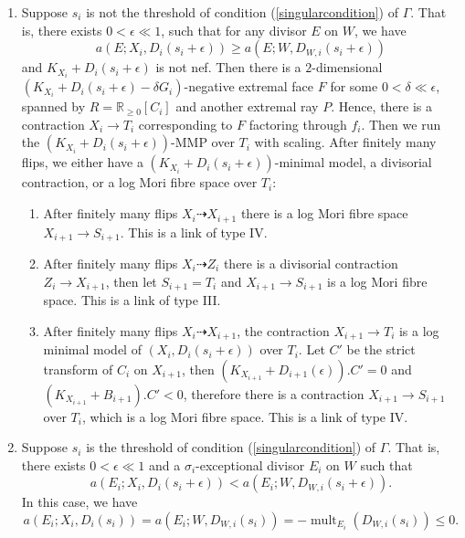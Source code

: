 \documentclass[11pt]{amsart}
\numberwithin{equation}{section}
\theoremstyle{definition}
\theoremstyle{definition}
\theoremstyle{definition}
\begin{document}
\begin{enumerate}
  \item\label{a} Suppose $s_{i}$ is not the threshold of  condition (\ref{singularcondition}) of $\Gamma$. That is, there exists $0<\epsilon\ll 1$, such that for any divisor $E$ on $W$, we have
  \[
    a(E;X_{i},D_{i}(s_{i}+\epsilon))\geqslant a(E;W,D_{W,i}(s_{i}+\epsilon))
  \]
  and $K_{X_{i}}+D_{i}(s_{i}+\epsilon)$ is not nef. Then there is a $2$-dimensional $(K_{X_{i}}+D_{i}(s_{i}+\epsilon)-\delta G_{i})$-negative extremal face $F$ for some $0< \delta \ll \epsilon $, spanned by $R=\mathbb{R}_{\geqslant 0}[C_{i}]$ and another extremal ray $P$. Hence, there is a contraction $X_{i}\to T_{i}$ corresponding to $F$ factoring through $f_{i}$. Then we run the $(K_{X_{i}}+D_{i}(s_{i}+\epsilon))$-MMP over $T_{i}$ with scaling. After finitely many flips, we either have a $(K_{X_{i}}+D_{i}(s_{i}+\epsilon))$-minimal model, a divisorial contraction, or a log Mori fibre space over $T_{i}$:
  \begin{enumerate}
    \item\label{a1}After finitely many flips $X_{i}\dashrightarrow X_{i+1}$ there is a log Mori fibre space $X_{i+1}\to S_{i+1}$. This is a link of type IV.
    \item\label{a2} After finitely many flips $X_{i}\dashrightarrow Z_{i}$ there is a divisorial contraction $Z_{i}\to X_{i+1}$, then let $S_{i+1}=T_{i}$ and $X_{i+1}\to S_{i+1}$ is a log Mori fibre space. This is a link of type III.
    \item \label{a3}After finitely many flips $X_{i}\dashrightarrow X_{i+1}$,  the contraction $X_{i+1}\to T_{i}$ is a log minimal model of $\left(X_{i},D_{i}\left(s_{i}+\epsilon\right)\right)$ over $T_{i}$. Let  $C'$ be the strict transform of  $C_{i}$ on $X_{i+1}$, then $(K_{X_{i+1}}+D_{i+1}(\epsilon)).C'=0$ and $(K_{X_{i+1}}+B_{i+1}).C'<0$, therefore there is a contraction  $X_{i+1} \to S_{i+1}$ over $T_i$, which is a log Mori fibre space. This is a link of type IV.
  \end{enumerate}
  \item\label{b} Suppose $s_{i}$ is the threshold of condition (\ref{singularcondition}) of $\Gamma$. That is, there exists  $0<\epsilon \ll 1$ and a $\sigma_{i}$-exceptional divisor $E_{i}$ on $W$ such that
  \[
    a(E_{i};X_{i},D_{i}(s_{i}+\epsilon))< a(E_{i};W,D_{W,i}(s_{i}+\epsilon))
    .\]
  In this case, we have
  \[
    a(E_{i};X_{i},D_{i}(s_{i}))= a(E_{i};W,D_{W,i}(s_{i}))=-\operatorname{mult}_{E_{i}}(D_{W,i}(s_{i}))\leqslant 0
    .\]


\end{enumerate}
\end{document}

